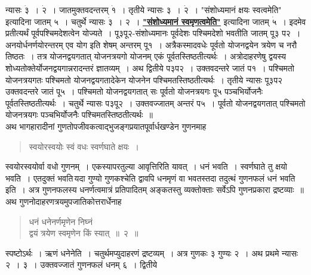 \documentclass[11pt, openany]{book}
\begin{document}
\noindent न्यासः  $\dot{\text{३}}$~। $\dot{\text{२}}$~। जातमुक्तवदन्तरम् $\dot{\text{१}}$~। तृतीये न्यासः ३~।
$\dot{\text{२}}$~। {\qt "संशोध्यमानं क्षयः स्वत्वमेति"} इत्यादिना जातम् ५~। चतुर्थे न्यासः $\dot{\text{३}}$~। २~। \hyperref[1.3]{\textbf{"संशोध्यमानं स्वमृणत्वमेति"}} इत्यादिना जातम् $\dot{\text{५}}$~। इदमेव प्रतीत्यर्थं पूर्वपश्चिमदेशत्वेन योज्यते~। पू३पू२-संशोध्यमानः पूर्वदेशः पश्चिमदेशो भवतीति जातम् पू३ प२~। अनयोर्धनर्णयोरन्तरम् एव योग इति शेषम् अन्तरम् पू१~। अत्रैकस्मादवधेः पूर्वतो योजनद्वयेन त्रयेण च नरौ तिष्ठतः~। तत्र योजनद्वयगतात् योजनत्रयगो योजनम् एकं पूर्वतस्तिष्ठतीत्यर्थः~। अत्रोदाहरणेषु द्वयस्य शोध्यतोक्तेर्योजनद्वयगान्नरादन्तरं ज्ञातव्यम्~। अथ द्वितीये प३प२~। उक्तवदन्तरे जातं प१~। पश्चिमतो योजनत्रयगतः पश्चिमतो योजनद्वयगतादेकेन योजनेन पश्चिमतस्तिष्ठतीत्यर्थः~। तृतीये न्यासः पू३प२ उक्तवदन्तरे जातं पू५~। पश्चिमतो योजनद्वयगतात् सः पूर्वतो \;योजनत्रयगः पू५ पञ्चभिर्योजनैः \;पूर्वतस्तिष्ठतीत्यर्थः~। चतुर्थे \;न्यासः प३पू२~। उक्तवज्जातम् अन्तरं प५~। पूर्वतो योजनद्वयगतात् पश्चिमतो योजनत्रयगः पञ्चभिर्योजनैः पश्चिमतस्तिष्ठतीत्यर्थः~॥ \\

\vspace{-3mm}
 अथ भागहारादीनां गुणतोपजीवकत्वाद्भुजङ्गप्रयातपूर्वार्धखण्डेन गुणनमाह\textendash 

 \label{1.4.1}
\begin{quote}
    \bs स्वयोरस्वयोः स्वं वधः स्वर्णघाते क्षयः~। 
\end{quote}

 स्वयोरस्वयोर्वा वधो गुणनम्~। एकस्यापरतुल्या आवृत्तिरिति यावत्~। धनं 
भवति~। स्वर्णघाते तु क्षयो भवति~। एतदुक्तं भवति\textendash \,यदा गुण्यो
गुणकश्चेति द्वावपि धनमृणं वा भवतस्तदा तदुत्थं गुणनफलं धनं भवति इति~। अत्र 
गुणनफलस्य धनर्णत्वमात्रं प्रतिपादितम् अङ्कतस्तु व्यक्तोक्ताः सर्वेऽपि
गुणनप्रकारा द्रष्टव्याः~॥ \\

\vspace{-3mm}
 अथ गुणनोदाहरणत्रयमुपजातिकोत्तरार्धेनाह\textendash  
\begin{quote}
    \ex
 धनं धनेनर्णमृणेन निघ्नं \\

\vspace{-7mm}
\hspace{1cm} द्वयं त्रयेण स्वमृणेन किं स्यात्~॥~२~॥
\end{quote}

 स्पष्टोऽर्थः~। ऋणं धनेनेति~। चतुर्थमप्युदाहरणं द्रष्टव्यम्~। अत्र गुणकः ३
गुण्यः २~। अथ प्रथमे न्यासः २~। ३~। उक्तवज्जातं गुणनफलं धनम् ६~। द्वितीये
\newpage%
\end{document}
